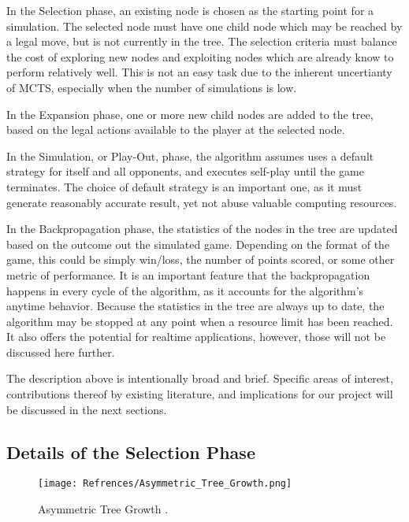 \documentclass[12pt, letterpaper, twoside]{article}
\begin{document}
In the Selection phase, an existing node is chosen as the starting point for a simulation. The selected node must have one child node which may be reached by a legal move, but is not currently in the tree. The selection criteria must balance the cost of exploring new nodes and exploiting nodes which are already know to perform relatively well. This is not an easy task due to the inherent uncertianty of MCTS, especially when the number of simulations is low.

In the Expansion phase, one or more new child nodes are added to the tree, based on the legal actions available to the player at the selected node.

In the Simulation, or Play-Out, phase, the algorithm assumes uses a default strategy for itself and all opponents, and executes self-play until the game terminates. The choice of default strategy is an important one, as it must generate reasonably accurate result, yet not abuse valuable computing resources.

In the Backpropagation phase, the statistics of the nodes in the tree are updated based on the outcome out the simulated game. Depending on the format of the game, this could be simply win/loss, the number of points scored, or some other metric of performance. It is an important feature that the backpropagation happens in every cycle of the algorithm, as it accounts for the algorithm's anytime behavior. Because the statistics in the tree are always up to date, the algorithm may be stopped at any point when a resource limit has been reached. It also offers the potential for realtime applications, however, those will not be discussed here further. 

The description above is intentionally broad and brief. Specific areas of interest,  contributions thereof by existing literature, and implications for our project will be discussed in the next sections.

\subsection{Details of the Selection Phase}

\begin{figure}
\begin{center}
  \texttt{[image: Refrences/Asymmetric\_Tree\_Growth.png]}
  \caption{Asymmetric Tree Growth \cite{mcts_survey}.}
  \label{fig:asymmetric}
 \end{center}
\end{figure}
\end{document}
